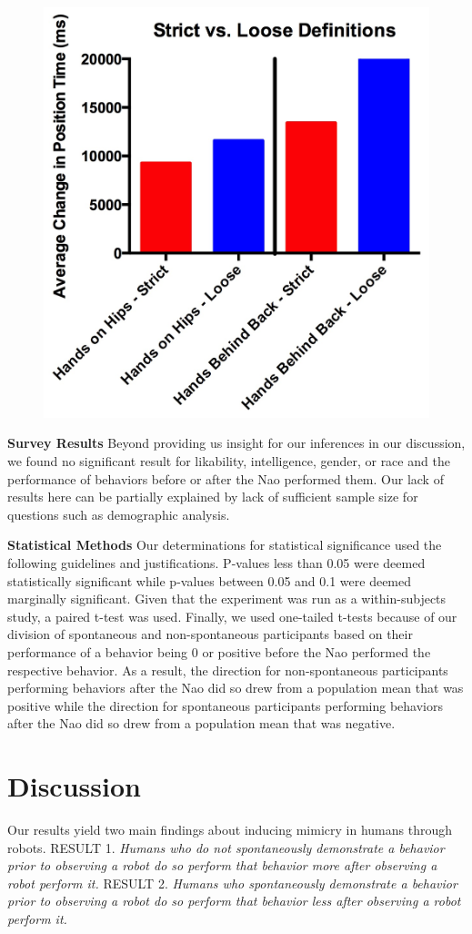 \documentclass{acm_proc_article-sp}
\begin{document}
\begin{figure}[t!]
\centering
 \includegraphics[width=0.65\linewidth]{svl.jpg}\\
 \label{svl} %
\end{figure}

\textbf{Survey Results} Beyond providing us insight for our inferences in our discussion, we found no significant result for likability, intelligence, gender, or race and the performance of behaviors before or after the Nao performed them. Our lack of results here can be partially explained by lack of sufficient sample size for questions such as demographic analysis.

\textbf{Statistical Methods} Our determinations for statistical significance used the following guidelines and justifications. P-values less than 0.05 were deemed statistically significant while p-values between 0.05 and 0.1 were deemed marginally significant. Given that the experiment was run as a within-subjects study, a paired t-test was used. Finally, we used one-tailed t-tests because of our division of spontaneous and non-spontaneous participants based on their performance of a behavior being 0 or positive before the Nao performed the respective behavior. As a result, the direction for non-spontaneous participants performing behaviors after the Nao did so drew from a population mean that was positive while the direction for spontaneous participants performing behaviors after the Nao did so drew from a population mean that was negative.

\section{Discussion}
Our results yield two main findings about inducing mimicry in humans through robots.
RESULT 1. \textit{Humans who do not spontaneously demonstrate a behavior prior to observing a robot do so perform that behavior more after observing a robot perform it.}
RESULT 2. \textit{Humans who spontaneously demonstrate a behavior prior to observing a robot do so perform that behavior less after observing a robot perform it.}
\end{document}
